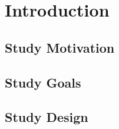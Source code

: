 \chapter{Introduction}
    
    \section{Study Motivation}
    
    \section{Study Goals}
    
    \section{Study Design}
